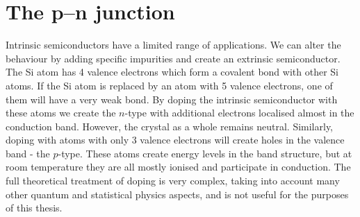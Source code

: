 \section{The p–n junction}
Intrinsic semiconductors have a limited range of applications. We can alter the behaviour by adding specific impurities and create an extrinsic semiconductor. The Si atom has 4 valence electrons which form a covalent bond with other Si atoms. If the Si atom is replaced by an atom with 5 valence electrons, one of them will have a very weak bond.
By doping the intrinsic semiconductor with these atoms we create the $n$-type with additional electrons localised almost in the conduction band. However, the crystal as a whole remains neutral. Similarly, doping with atoms with only 3 valence electrons will create holes in the valence band - the $p$-type.
These atoms create energy levels in the band structure, but at room temperature they are all mostly ionised and participate in conduction. The full theoretical treatment of doping is very complex, taking into account many other quantum and statistical physics aspects, and is not useful for the purposes of this thesis. 

